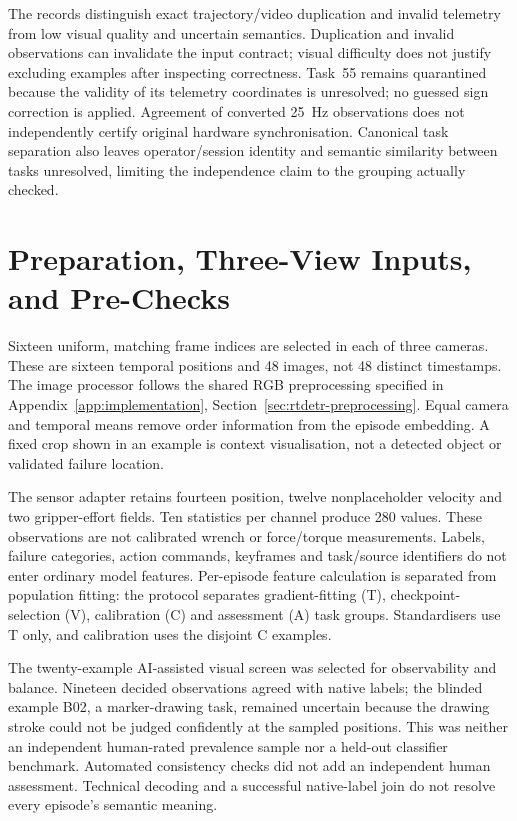 The records distinguish exact trajectory/video duplication and invalid telemetry from
low visual quality and uncertain semantics. Duplication and invalid observations can
invalidate the input contract; visual difficulty does not justify excluding examples
after inspecting correctness. Task~55 remains quarantined because the validity of its telemetry coordinates is
unresolved; no guessed sign correction is applied. Agreement of converted 25~Hz observations does not
independently certify original hardware synchronisation. Canonical task separation also
leaves operator/session identity and semantic similarity between tasks unresolved,
limiting the independence claim to the grouping actually checked.

\section{Preparation, Three-View Inputs, and Pre-Checks}
Sixteen uniform, matching frame indices are selected in each of three cameras. These are
sixteen temporal positions and 48 images, not 48 distinct timestamps. The image
processor follows the shared RGB preprocessing specified in
Appendix~\ref{app:implementation}, Section~\ref{sec:rtdetr-preprocessing}.
Equal camera and temporal means remove order information from
the episode embedding. A fixed crop shown in an example is context visualisation, not a
detected object or validated failure location.

The sensor adapter retains fourteen position, twelve nonplaceholder velocity and two
gripper-effort fields. Ten statistics per channel produce 280 values. These observations
are not calibrated wrench or force/torque measurements. Labels, failure categories,
action commands, keyframes and task/source identifiers do not enter ordinary model
features. Per-episode feature calculation is separated from population fitting:
the protocol separates gradient-fitting (T), checkpoint-selection (V), calibration (C)
and assessment (A) task groups. Standardisers use T only, and calibration uses the
disjoint C examples.

The twenty-example AI-assisted visual screen was selected for observability and
balance. Nineteen decided observations agreed with native labels; the blinded example
B02, a marker-drawing task, remained uncertain because the drawing stroke could not be
judged confidently at the sampled positions. This was neither an independent human-rated
prevalence sample nor a held-out classifier benchmark. Automated consistency checks
did not add an independent human assessment. Technical decoding and a successful native-label join do
not resolve every episode's semantic meaning.

